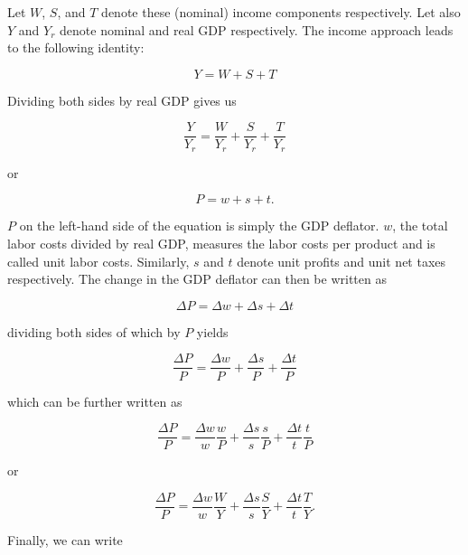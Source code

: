 \documentclass[
  letterpaper,
  DIV=11,
  numbers=noendperiod]{scrartcl}
\begin{document}
Let \(W\), \(S\), and \(T\) denote these (nominal) income components
respectively. Let also \(Y\) and \(Y_r\) denote nominal and real GDP
respectively. The income approach leads to the following identity:

\[Y = W + S + T\]

Dividing both sides by real GDP gives us

\[\frac{Y}{Y_r} = \frac{W}{Y_r} + \frac{S}{Y_r} + \frac{T}{Y_r}\]

or

\[P = w + s + t.\]

\(P\) on the left-hand side of the equation is simply the GDP deflator.
\(w\), the total labor costs divided by real GDP, measures the labor
costs per product and is called unit labor costs. Similarly, \(s\) and
\(t\) denote unit profits and unit net taxes respectively. The change in
the GDP deflator can then be written as

\[\Delta P = \Delta w + \Delta s + \Delta t\]

dividing both sides of which by \(P\) yields

\[\frac{\Delta P}{P} = \frac{\Delta w}{P} + \frac{\Delta s}{P} + \frac{\Delta t}{P}\]

which can be further written as

\[\frac{\Delta P}{P} = \frac{\Delta w}{w}\frac{w}{P} + \frac{\Delta s}{s}\frac{s}{P} + \frac{\Delta t}{t}\frac{t}{P}\]

or

\[\frac{\Delta P}{P} = \frac{\Delta w}{w}\frac{W}{Y} + \frac{\Delta s}{s}\frac{S}{Y} + \frac{\Delta t}{t}\frac{T}{Y}.\]

Finally, we can write
\end{document}
